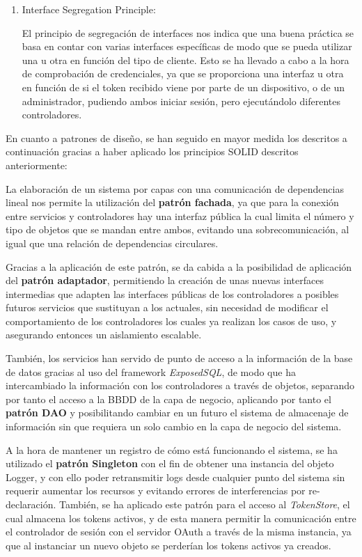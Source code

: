 \begin{enumerate}
            \item Interface Segregation Principle:
            
            El principio de segregación de interfaces nos indica que una buena práctica se basa en contar con varias interfaces específicas de modo que se pueda utilizar una u otra en función del tipo de cliente.
            Esto se ha llevado a cabo a la hora de comprobación de credenciales, ya que se proporciona una interfaz u otra en función de si el token recibido viene por parte de un dispositivo, o de un administrador, pudiendo ambos iniciar sesión, pero ejecutándolo diferentes controladores.
            
        \end{enumerate}
        
        En cuanto a patrones de diseño, se han seguido en mayor medida los descritos a continuación gracias a haber aplicado los principios SOLID descritos anteriormente:
        
        La elaboración de un sistema por capas con una comunicación de dependencias lineal nos permite la utilización del \textbf{patrón fachada}, ya que para la conexión entre servicios y controladores hay una interfaz pública la cual limita el número y tipo de objetos que se mandan entre ambos, evitando una sobrecomunicación, al igual que una relación de dependencias circulares.
        
        Gracias a la aplicación de este patrón, se da cabida a la posibilidad de aplicación del \textbf{patrón adaptador}, permitiendo la creación de unas nuevas interfaces intermedias que adapten las interfaces públicas de los controladores a posibles futuros servicios que sustituyan a los actuales, sin necesidad de modificar el comportamiento de los controladores los cuales ya realizan los casos de uso, y asegurando entonces un aislamiento escalable.
        
        También, los servicios han servido de punto de acceso a la información de la base de datos gracias al uso del framework \textit{ExposedSQL}, de modo que ha intercambiado la información con los controladores a través de objetos, separando por tanto el acceso a la BBDD de la capa de negocio, aplicando por tanto el \textbf{patrón DAO} y posibilitando cambiar en un futuro el sistema de almacenaje de información sin que requiera un solo cambio en la capa de negocio del sistema.
        
        A la hora de mantener un registro de cómo está funcionando el sistema, se ha utilizado el \textbf{patrón Singleton} con el fin de obtener una instancia del objeto Logger, y con ello poder retransmitir logs desde cualquier punto del sistema sin requerir aumentar los recursos y evitando errores de interferencias por re-declaración. También, se ha aplicado este patrón para el acceso al \textit{TokenStore}, el cual almacena los tokens activos, y de esta manera permitir la comunicación entre el controlador de sesión con el servidor OAuth a través de la misma instancia, ya que al instanciar un nuevo objeto se perderían los tokens activos ya creados.
    
